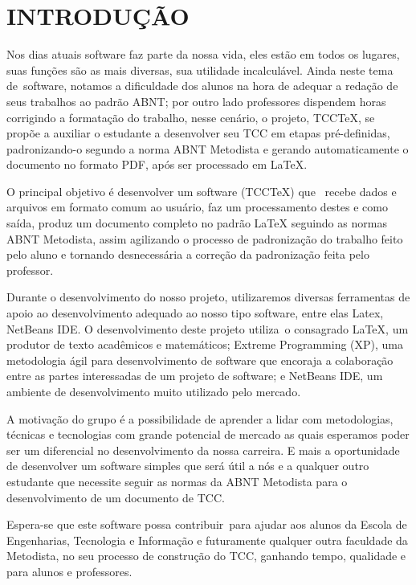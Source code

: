 \chapter[INTRODU\c{C}\~AO]{\foreignlanguage{portuges}{INTRODU\c{C}\~AO}}

\bigskip

{
Nos dias atuais software faz parte da nossa vida, eles est\~ao em todos os lugares, suas fun\c{c}\~oes s\~ao as mais
diversas, sua utilidade incalcul\'avel. Ainda neste tema de\ software, notamos a dificuldade dos alunos na hora de
adequar a reda\c{c}\~ao de seus trabalhos ao padr\~ao ABNT; por outro lado professores dispendem horas corrigindo a
formata\c{c}\~ao do trabalho, nesse cen\'ario, o projeto, TCCTeX, se prop\~oe a auxiliar o estudante a desenvolver seu
TCC em etapas pr\'e-definidas, padronizando-o segundo a norma ABNT Metodista e gerando automaticamente o documento no
formato PDF, ap\'os ser processado em {\LaTeX}.}

{
O principal objetivo \'e desenvolver um software (TCCTeX) que \ recebe dados e arquivos em formato comum ao usu\'ario,
faz um processamento destes e como sa\'ida, produz um documento completo no padr\~ao {\LaTeX} seguindo as normas ABNT
Metodista, assim agilizando o processo de padroniza\c{c}\~ao do trabalho feito pelo aluno e tornando desnecess\'aria a
corre\c{c}\~ao da padroniza\c{c}\~ao feita pelo professor.}

{
Durante o desenvolvimento do nosso projeto, utilizaremos diversas ferramentas de apoio ao desenvolvimento adequado ao
nosso tipo software, entre elas Latex, NetBeans IDE. O desenvolvimento deste projeto utiliza\ o consagrado {\LaTeX}, um
produtor de texto acad\^emicos e matem\'aticos; Extreme Programming (XP), uma metodologia \'agil para desenvolvimento
de software que encoraja a colabora\c{c}\~ao entre as partes interessadas de um projeto de software; e NetBeans IDE, um
ambiente de desenvolvimento muito utilizado pelo mercado.}

{
A motiva\c{c}\~ao do grupo \'e a possibilidade de aprender a lidar com metodologias, t\'ecnicas e tecnologias com grande
potencial de mercado as quais esperamos poder ser um diferencial no desenvolvimento da nossa carreira. E mais a
oportunidade de desenvolver um software simples que ser\'a \'util a n\'os e a qualquer outro estudante que necessite
seguir as normas da ABNT Metodista para o desenvolvimento de um documento de TCC.\ }

{
Espera-se que este software possa contribuir\ para ajudar aos alunos da Escola de Engenharias, Tecnologia e
Informa\c{c}\~ao e futuramente qualquer outra faculdade da Metodista, no seu processo de constru\c{c}\~ao do TCC,
ganhando tempo, qualidade e para alunos e professores.}


\bigskip

